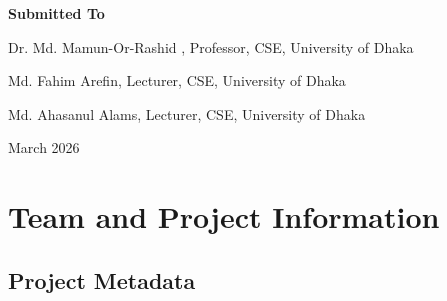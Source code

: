 \documentclass[12pt,a4paper]{article}
\begin{document}
\begin{titlepage}
\begin{center}
{  }
  \vspace{1em}
  \textbf{\large\color{Gold}Submitted To}\par
  \vspace{0.5em}
  {\color{white}Dr. Md. Mamun-Or-Rashid
, Professor,
CSE, University of Dhaka\par}
  {\color{white}Md. Fahim Arefin, Lecturer,
CSE, University of Dhaka\par}
  {\color{white}Md. Ahasanul Alams, Lecturer,
CSE, University of Dhaka\par}
  \vspace{0.5em}
  {\color{white!70}\small March 2026\par}
  \vfill
\end{center}
\end{titlepage}
\newpage


\tableofcontents
\newpage

\section{Team and Project Information}

\subsection{Project Metadata}
\end{document}
